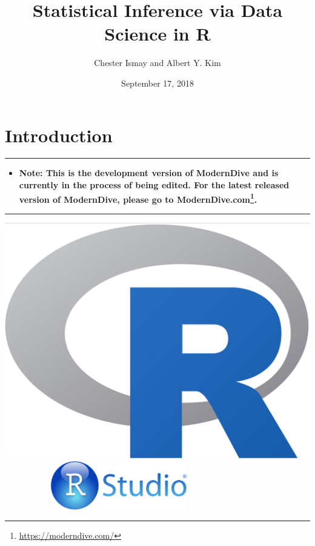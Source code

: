 \documentclass[12pt,]{krantz}
\title{Statistical Inference via Data Science in R}
\author{Chester Ismay and Albert Y. Kim}
\date{September 17, 2018}
\renewcommand{\href}[2]{#2\footnote{\url{#1}}}
\newenvironment{rmdblock}[1]
  {\begin{shaded*}
  \begin{itemize}
  \renewcommand{\labelitemi}{
    \raisebox{-.7\height}[0pt][0pt]{
    }
  }
  \item
  }
  {
  \end{itemize}
  \end{shaded*}
  }
\newenvironment{learncheck}
  {\begin{rmdblock}{warning}}
  {\end{rmdblock}}
\begin{document}
\maketitle


\thispagestyle{empty}

\begin{center}
\end{center}

\setlength{\abovedisplayskip}{-5pt}
\setlength{\abovedisplayshortskip}{-5pt}

{
\hypersetup{linkcolor=black}
\setcounter{tocdepth}{2}
\tableofcontents
}
\listoftables
\listoffigures
\mainmatter

\chapter{Introduction}\label{intro}

\begin{center}\rule{0.5\linewidth}{\linethickness}\end{center}

\begin{learncheck}
\textbf{Note: This is the development version of ModernDive and is
currently in the process of being edited. For the latest released
version of ModernDive, please go to
\href{https://moderndive.com/}{ModernDive.com}.}
\end{learncheck}

\begin{center}\rule{0.5\linewidth}{\linethickness}\end{center}

\includegraphics[height=0.20000\textwidth]{images/Rlogo.png} \hfill    
   
\includegraphics[width=0.45000\textwidth]{images/RStudio-Logo-Blue-Gradient.png}
\end{document}
